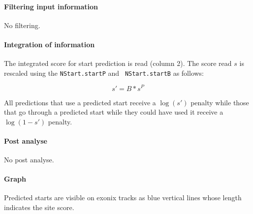 \paragraph{Filtering input information}

No filtering.

\paragraph{Integration of information}

The integrated score for start prediction is read (column 2).  The
score read $s$ is rescaled using the {\tt NStart.startP} and {\tt
NStart.startB} as follows:

\[s' = B*s^P\]

All predictions that use a predicted start receive a $\log(s')$
penalty while those that go through a predicted start while they
could have used it receive a $\log(1-s')$ penalty.


\paragraph{Post analyse}

No post analyse.

\paragraph{Graph}

Predicted starts are visible on exonix tracks as blue vertical lines
whose length indicates the site score.






